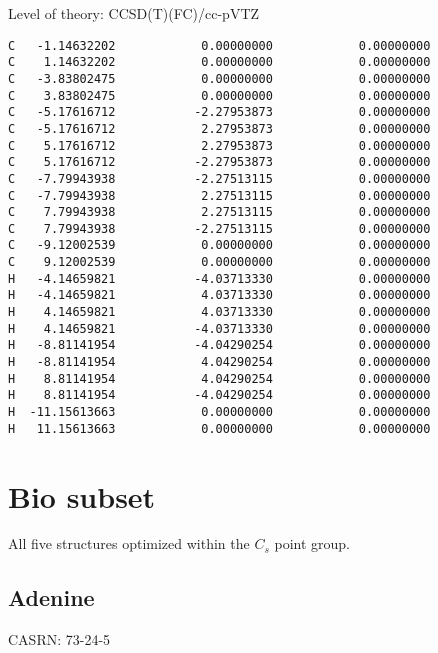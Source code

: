 \documentclass[journal=jctcce,manuscript=article,layout=traditional]{achemso}
\newcommand{\TZ}{cc-pVTZ}
\begin{document}
\begin{singlespace}
\noindent Level of theory: CCSD(T)(FC)/{\TZ}
\begin{verbatim}
C   -1.14632202            0.00000000            0.00000000
C    1.14632202            0.00000000            0.00000000
C   -3.83802475            0.00000000            0.00000000
C    3.83802475            0.00000000            0.00000000
C   -5.17616712           -2.27953873            0.00000000
C   -5.17616712            2.27953873            0.00000000
C    5.17616712            2.27953873            0.00000000
C    5.17616712           -2.27953873            0.00000000
C   -7.79943938           -2.27513115            0.00000000
C   -7.79943938            2.27513115            0.00000000
C    7.79943938            2.27513115            0.00000000
C    7.79943938           -2.27513115            0.00000000
C   -9.12002539            0.00000000            0.00000000
C    9.12002539            0.00000000            0.00000000
H   -4.14659821           -4.03713330            0.00000000
H   -4.14659821            4.03713330            0.00000000
H    4.14659821            4.03713330            0.00000000
H    4.14659821           -4.03713330            0.00000000
H   -8.81141954           -4.04290254            0.00000000
H   -8.81141954            4.04290254            0.00000000
H    8.81141954            4.04290254            0.00000000
H    8.81141954           -4.04290254            0.00000000
H  -11.15613663            0.00000000            0.00000000
H   11.15613663            0.00000000            0.00000000
\end{verbatim}
\end{singlespace}

\clearpage

\section{Bio subset}

All five structures optimized within the $C_s$ point group.

\subsection{Adenine}

CASRN:  73-24-5
\end{document}
